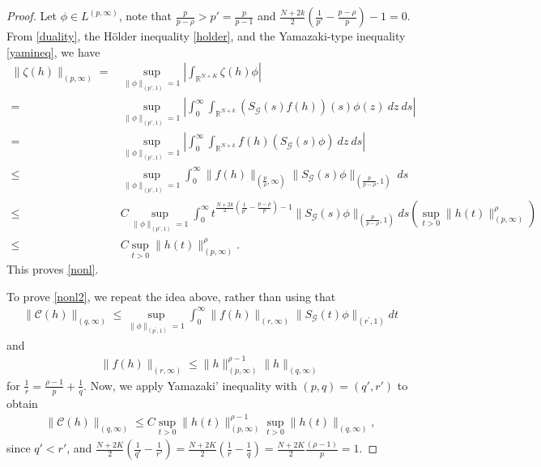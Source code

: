 \documentclass[12pt]{amsart}
\begin{document}
\begin{proof}
	Let $\phi \in L^{(p, \infty)}$, note that $\frac{p}{p-\rho}>p'=\frac{p}{p-1}$ and $\frac{N+2 k}{2}\left(\frac{1}{p'}-\frac{p-\rho}{p}\right)-1=0$. From \eqref{duality}, the Hölder inequality \ref{holder}, and the Yamazaki-type inequality \eqref{yamineq}, we have
	\begin{align*}
		\|\zeta(h)\|_{(p, \infty)} = & \sup_{\|\phi\|_{(p', 1)}=1} \left| \int_{\mathbb{R}^{N+K}} \zeta(h) \phi \right|\\
		= & \sup_{\|\phi\|_{(p', 1)}=1} \left| \int_{0}^{\infty} \int_{\mathbb{R}^{N+k}} (S_\mathcal{G}(s) f(h))(s) \phi(z) \ dz \ ds\right| \\
		= &  \sup_{\|\phi\|_{(p', 1)}=1} \left| \int_{0}^{\infty} \int_{\mathbb{R}^{N+k}} f(h)(S_\mathcal{G}(s) \phi) \ dz \ ds\right| \\
		\leq & \sup_{\|\phi\|_{(p', 1)}=1} \int_{0}^{\infty}\|f(h)\|_{\left(\frac{p}{\rho}, \infty\right)} \|S_\mathcal{G}(s) \phi\|_{\left(\frac{p}{p - \rho}, 1\right)} \ ds \\
		\leq & C \sup_{\|\phi\|_{(p', 1)}=1} \int_{0}^{\infty} t^{\frac{N+2 k}{2}\left(\frac{1}{p'}-\frac{p-\rho}{p}\right)-1} \|S_\mathcal{G}(s) \phi\|_{\left(\frac{p}{p - \rho}, 1\right)} ds \left(\sup_{t>0} \|h(t)\|^\rho_{(p,\infty)}\right) \\
		\leq & C \sup_{t>0} \|h(t)\|^\rho_{(p,\infty)} .
	\end{align*}
	This proves \eqref{nonl}.
	
	To prove \eqref{nonl2}, we repeat the idea above, rather than using that
	\begin{eqnarray*}
		\|\mathcal{C}(h)\|_{(q,\infty)}\leq \sup _{\|\phi\|_{(p^{\prime},1)}=1}\int_0^{\infty}\|f(h)\|_{(r,\infty)}\|S_{\mathcal{G}}(t)\phi\|_{(r^{\prime},1)}dt
	\end{eqnarray*}
	and
	\begin{eqnarray*}
		\|f(h)\|_{(r,\infty)}\leq\|h\|^{\rho-1}_{(p,\infty)}\|h\|_{(q,\infty)}
	\end{eqnarray*}
	for $\frac{1}{r}=\frac{\rho-1}{p}+\frac{1}{q}$. Now, we apply Yamazaki' inequality with $(p,q)=(q',r')$ to obtain
	\begin{eqnarray*}
		\|\mathcal{C}(h)\|_{(q,\infty)}\leq C\sup_{t>0} \|h(t)\|^{\rho -1}_{(p,\infty)}\sup_{t>0} \|h(t)\|_{(q,\infty)} ,
	\end{eqnarray*}
	since $q'<r'$, and $\frac{N+2K}{2}\left(\frac{1}{q'}-\frac{1}{r'}\right)=\frac{N+2K}{2}\left(\frac{1}{r}-\frac{1}{q}\right)=\frac{N+2K}{2}\frac{(\rho-1)}{p}=1$.
\end{proof} 
\end{document}
